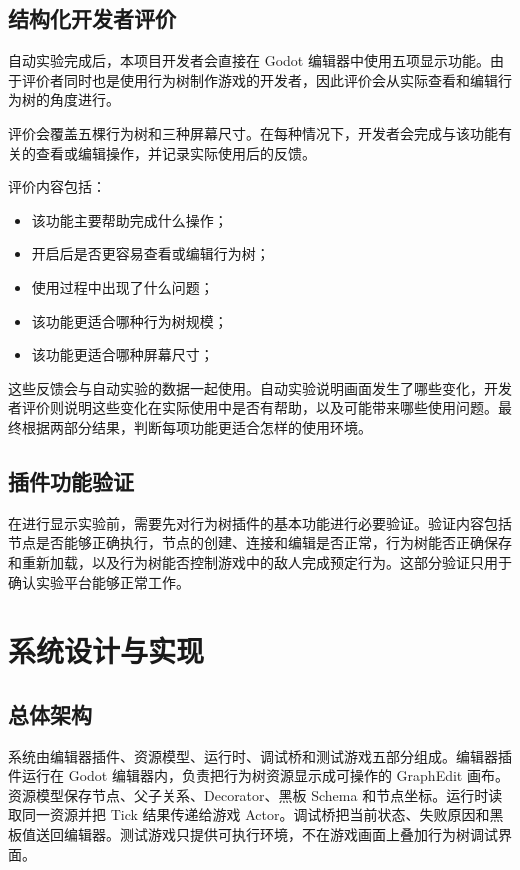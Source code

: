 \documentclass[11pt,a4paper,oneside,extrafontsizes]{memoir}
\begin{document}
\section{结构化开发者评价}

自动实验完成后，本项目开发者会直接在 Godot 编辑器中使用五项显示功能。由于评价者同时也是使用行为树制作游戏的开发者，因此评价会从实际查看和编辑行为树的角度进行。

评价会覆盖五棵行为树和三种屏幕尺寸。在每种情况下，开发者会完成与该功能有关的查看或编辑操作，并记录实际使用后的反馈。

评价内容包括：

\begin{itemize}[leftmargin=*]
\item 该功能主要帮助完成什么操作；
\item 开启后是否更容易查看或编辑行为树；
\item 使用过程中出现了什么问题；
\item 该功能更适合哪种行为树规模；
\item 该功能更适合哪种屏幕尺寸；
\end{itemize}

这些反馈会与自动实验的数据一起使用。自动实验说明画面发生了哪些变化，开发者评价则说明这些变化在实际使用中是否有帮助，以及可能带来哪些使用问题。最终根据两部分结果，判断每项功能更适合怎样的使用环境。

\section{插件功能验证}

在进行显示实验前，需要先对行为树插件的基本功能进行必要验证。验证内容包括节点是否能够正确执行，节点的创建、连接和编辑是否正常，行为树能否正确保存和重新加载，以及行为树能否控制游戏中的敌人完成预定行为。这部分验证只用于确认实验平台能够正常工作。

\chapter{系统设计与实现}

\section{总体架构}

系统由编辑器插件、资源模型、运行时、调试桥和测试游戏五部分组成。编辑器插件运行在 Godot 编辑器内，负责把行为树资源显示成可操作的 GraphEdit 画布。资源模型保存节点、父子关系、Decorator、黑板 Schema 和节点坐标。运行时读取同一资源并把 Tick 结果传递给游戏 Actor。调试桥把当前状态、失败原因和黑板值送回编辑器。测试游戏只提供可执行环境，不在游戏画面上叠加行为树调试界面。
\end{document}
